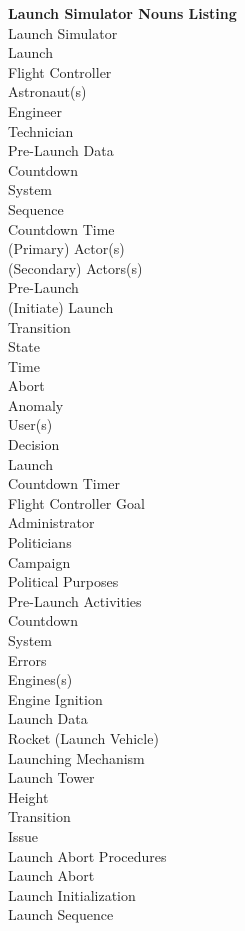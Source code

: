 \documentclass[letterpaper]{article}
\begin{document}
\noindent
\textbf{Launch Simulator Nouns Listing}\\
Launch Simulator\\
Launch\\
Flight Controller\\
Astronaut(s)\\
Engineer\\
Technician\\
Pre-Launch Data\\
Countdown\\
System\\
Sequence\\
Countdown Time\\
(Primary) Actor(s)\\
(Secondary) Actors(s)\\
Pre-Launch\\
(Initiate) Launch\\
Transition\\
State\\
Time\\
Abort\\
Anomaly\\
User(s)\\
Decision\\
Launch\\
Countdown Timer\\
Flight Controller Goal\\
Administrator\\
Politicians\\
Campaign\\
Political Purposes\\
Pre-Launch Activities\\
Countdown\\
System\\
Errors\\
Engines(s)\\
Engine Ignition\\
Launch Data\\
Rocket (Launch Vehicle)\\
Launching Mechanism\\
Launch Tower\\
Height\\
Transition\\
Issue\\
Launch Abort Procedures\\
Launch Abort\\
Launch Initialization\\
Launch Sequence\\
\end{document}
